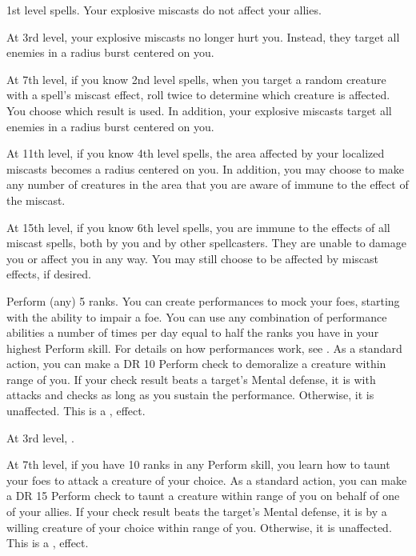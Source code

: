     \featpre 1st level spells.
    \featben Your explosive miscasts do not affect your allies.

    At 3rd level, your explosive miscasts no longer hurt you.
    Instead, they target all enemies in a \areasmall radius burst centered on you.

    At 7th level, if you know 2nd level spells, when you target a random creature with a spell's miscast effect, roll twice to determine which creature is affected.
    You choose which result is used.
    In addition, your explosive miscasts target all enemies in a \areamed radius burst centered on you.

    At 11th level, if you know 4th level spells, the area affected by your localized miscasts becomes a \areamed radius centered on you.
    In addition, you may choose to make any number of creatures in the area that you are aware of immune to the effect of the miscast.

    At 15th level, if you know 6th level spells, you are immune to the effects of all miscast spells, both by you and by other spellcasters.
    They are unable to damage you or affect you in any way.
    You may still choose to be affected by miscast effects, if desired.

    \featpre Perform (any) 5 ranks.
    \featben You can create performances to mock your foes, starting with the ability to impair a foe.
    You can use any combination of performance abilities a number of times per day equal to half the ranks you have in your highest Perform skill.
    For details on how performances work, see .
     As a standard action, you can make a DR 10 Perform check to demoralize a creature within \rngmed range of you.
    If your check result beats a target's Mental defense, it is \impaired with attacks and checks as long as you sustain the performance.
    Otherwise, it is unaffected.
    This is a ,  effect.

    At 3rd level, \tdash.

    At 7th level, if you have 10 ranks in any Perform skill, you learn how to taunt your foes to attack a creature of your choice.
     As a standard action, you can make a DR 15 Perform check to taunt a creature within \rngmed range of you on behalf of one of your allies.
    If your check result beats the target's Mental defense, it is \taunted by a willing creature of your choice within \rngmed range of you.
    Otherwise, it is unaffected.
    This is a ,  effect.

